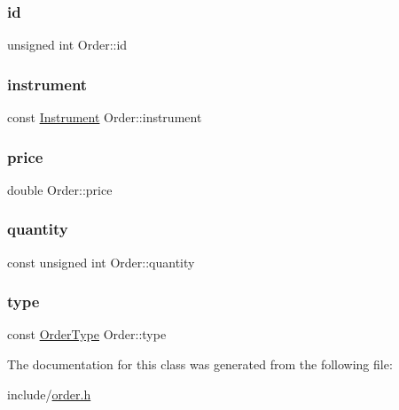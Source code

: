 \subsubsection{\texorpdfstring{id}{id}}
{\footnotesize\ttfamily unsigned int Order\+::id}

\mbox{\label{classOrder_a34659d82ec58efd7a249c8412be5a8c2}} 
\subsubsection{\texorpdfstring{instrument}{instrument}}
{\footnotesize\ttfamily const \hyperlink{classInstrument}{Instrument} Order\+::instrument}

\mbox{\label{classOrder_a22df57af82ecda59bd0ed1f7534a170b}} 
\subsubsection{\texorpdfstring{price}{price}}
{\footnotesize\ttfamily double Order\+::price}

\mbox{\label{classOrder_a77525cd65ce276fb5dce2177de41f33f}} 
\subsubsection{\texorpdfstring{quantity}{quantity}}
{\footnotesize\ttfamily const unsigned int Order\+::quantity}

\mbox{\label{classOrder_a131d51d58056d8e34b200b3661d091f2}} 
\subsubsection{\texorpdfstring{type}{type}}
{\footnotesize\ttfamily const \hyperlink{order_8h_a57124e387290311f33f3b54a54930418}{Order\+Type} Order\+::type}



The documentation for this class was generated from the following file\+:\begin{DoxyCompactItemize}
\item 
include/\hyperlink{order_8h}{order.\+h}\end{DoxyCompactItemize}

